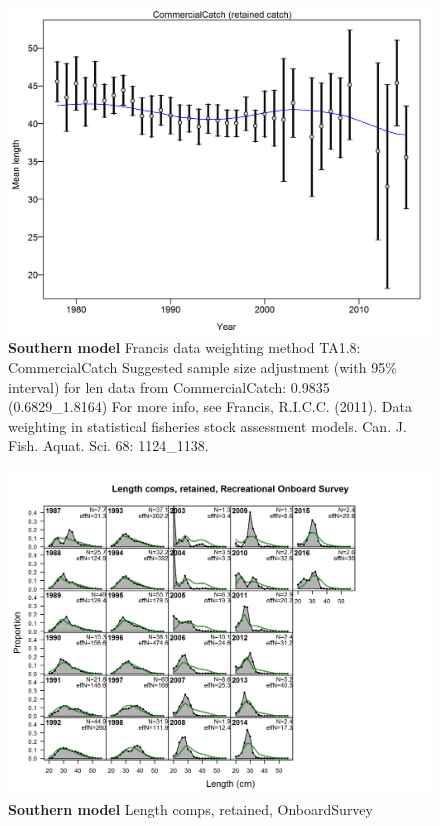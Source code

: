 \documentclass[12pt,]{article}
\begin{document}
\begin{figure}[htbp]
\centering
\includegraphics{./r4ss/plots_mod2/comp_lenfit_data_weighting_TA1.8_CommercialCatch.png}
\caption{\textbf{Southern model} Francis data weighting method TA1.8:
CommercialCatch Suggested sample size adjustment (with 95\% interval)
for len data from CommercialCatch: 0.9835 (0.6829\_1.8164) For more
info, see Francis, R.I.C.C. (2011). Data weighting in statistical
fisheries stock assessment models. Can. J. Fish. Aquat. Sci. 68:
1124\_1138.
\label{fig:mod2_8_comp_lenfit_data_weighting_TA1.8_CommercialCatch}}
\end{figure}

\begin{figure}[htbp]
\centering
\includegraphics{./r4ss/plots_mod2/comp_lenfit_flt3mkt2.png}
\caption{\textbf{Southern model} Length comps, retained, OnboardSurvey
\label{fig:mod2_9_comp_lenfit_flt3mkt2}}
\end{figure}
\end{document}
